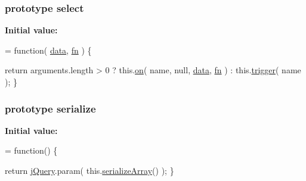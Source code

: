 \subsubsection[{select}]{ {\bf prototype} select}\label{jquery-1_810_82-vsdoc_8js_a861f73402c6bb8457b04e4c36686ce8c}
{\bfseries Initial value\+:}
\begin{DoxyCode}
= \textcolor{keyword}{function}( \hyperlink{jquery-1_810_82-vsdoc_8js_a609407b3456fdc3c5671a9fc4a226ff7}{data}, \hyperlink{jquery-1_810_82-vsdoc_8js_acef6bdaf6b9b20fdcca1ea86f0902c3b}{fn} ) \{


        \textcolor{keywordflow}{return} arguments.length > 0 ?
            this.\hyperlink{jquery-1_810_82-vsdoc_8js_ae453b412b883f60220d73468ef6c6dbc}{on}( name, null, \hyperlink{jquery-1_810_82-vsdoc_8js_a609407b3456fdc3c5671a9fc4a226ff7}{data}, \hyperlink{jquery-1_810_82-vsdoc_8js_acef6bdaf6b9b20fdcca1ea86f0902c3b}{fn} ) :
            this.\hyperlink{jquery-1_810_82-vsdoc_8js_a2388c4114d5e3e4eab020f973641519c}{trigger}( name );
    \}
\end{DoxyCode}
\hypertarget{jquery-1_810_82-vsdoc_8js_a4df62e04698a766c2951740e57243503}{}
\subsubsection[{serialize}]{ {\bf prototype} serialize}\label{jquery-1_810_82-vsdoc_8js_a4df62e04698a766c2951740e57243503}
{\bfseries Initial value\+:}
\begin{DoxyCode}
= \textcolor{keyword}{function}() \{


        \textcolor{keywordflow}{return} \hyperlink{jquery-1_810_82-vsdoc_8js_add5237586d970a38a81f990e8eb28c6c}{jQuery}.param( this.\hyperlink{jquery-1_810_82-vsdoc_8js_a0ba7b24b29b3762704d7b7da11b98315}{serializeArray}() );
    \}
\end{DoxyCode}
\hypertarget{jquery-1_810_82-vsdoc_8js_a0ba7b24b29b3762704d7b7da11b98315}{}
